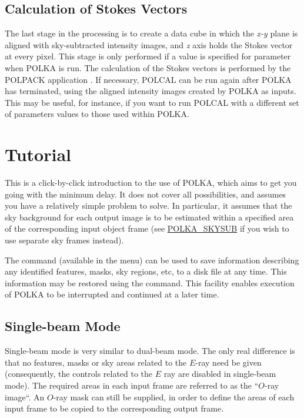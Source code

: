 \subsection{Calculation of Stokes Vectors}
The last stage in the processing is to create a data cube in which the
{\em x-y} plane is aligned with sky-subtracted intensity images, and {\em
z} axis holds the Stokes vector at every pixel. This stage is only
performed if a value is specified for parameter 
when POLKA is run. The calculation of the Stokes vectors is performed by
the POLPACK application . If necessary, 
POLCAL can be run again after POLKA has terminated, using the aligned
intensity images created by POLKA as inputs. This may be useful, for
instance, if you want to run POLCAL with a different set of parameters 
values to those used within POLKA.

\section {Tutorial}
This is a click-by-click introduction to the use of POLKA, which aims to
get you going with the minimum delay. It does not cover all possibilities,
and assumes you have a relatively simple problem to solve. In particular, 
it assumes that the sky background for each output image is to be
estimated within a specified area of the corresponding input object frame
(see \hyperref{here}{section }{}{POLKA_SKYSUB} if you wish to use
separate sky frames instead).

The  command (available in the
 menu) can be used to save
information describing any identified features, masks, sky regions, etc,
to a disk file at any time. This information may be restored using the
 command. This facility enables
execution of POLKA to be interrupted and continued at a later time.

\subsection {Single-beam Mode}
Single-beam mode is very similar to dual-beam mode. The only real
difference is that no features, masks or sky areas related to the $E$-ray
need be given (consequently, the controls related to the $E$ ray are
disabled in single-beam mode). The required areas in each input frame are
referred to as the ``$O$-ray image``. An $O$-ray mask can still be
supplied, in order to define the areas of each input frame to be copied
to the corresponding output frame.


